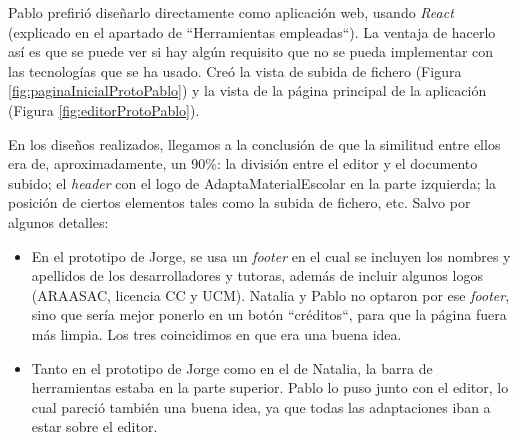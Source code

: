 	
	Pablo prefiri\'o dise\~{n}arlo directamente como aplicaci\'on web, usando \textit{React} (explicado en el apartado de ``Herramientas empleadas``). La ventaja de hacerlo as\'i es que se puede ver si hay alg\'un requisito que no se pueda implementar con las tecnolog\'ias que se ha usado. Cre\'o la vista de subida de fichero (Figura \ref{fig:paginaInicialProtoPablo}) y la vista de la p\'agina principal de la aplicaci\'on (Figura \ref{fig:editorProtoPablo}).
	
	
	En los dise\~{n}os realizados, llegamos a la conclusi\'on de que la similitud entre ellos era de, aproximadamente, un 90\%: la divisi\'on entre el editor y el documento subido; el \textit{header} con el logo de AdaptaMaterialEscolar en la parte izquierda; la posici\'on de ciertos elementos tales como la subida de fichero, etc. Salvo por algunos detalles:
	
	\begin{itemize}
		\item En el prototipo de Jorge, se usa un \textit{footer} en el cual se incluyen los nombres y apellidos de los desarrolladores y tutoras, adem\'as de incluir algunos logos (ARAASAC, licencia CC y UCM). Natalia y Pablo no optaron por ese \textit{footer}, sino que ser\'ia mejor ponerlo en un bot\'on ``cr\'editos``, para que la p\'agina fuera m\'as limpia. Los tres coincidimos en que era una buena idea.
		\item Tanto en el prototipo de Jorge como en el de Natalia, la barra de herramientas estaba en la parte superior. Pablo lo puso junto con el editor, lo cual pareci\'o tambi\'en una buena idea, ya que todas las adaptaciones iban a estar sobre el editor.
	\end{itemize}